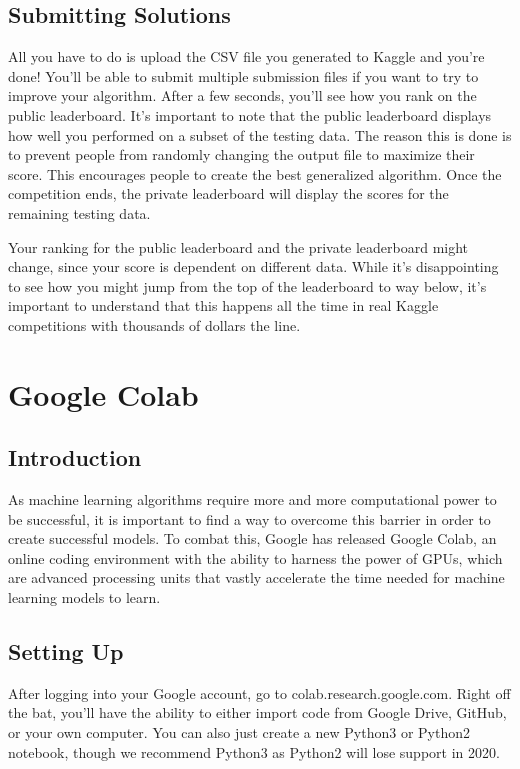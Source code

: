 \documentclass{article}
\begin{document}
\subsection{Submitting Solutions}
All you have to do is upload the CSV file you generated to Kaggle and you're done! You'll be able to submit multiple submission files if you want to try to improve your algorithm.  
After a few seconds, you'll see how you rank on the public leaderboard. It's important to note that the public leaderboard displays how well you performed on a subset of the testing data. The reason this is done is to prevent people from randomly changing the output file to maximize their score. This encourages people to create the best generalized algorithm. Once the competition ends, the private leaderboard will display the scores for the remaining testing data. 

Your ranking for the public leaderboard and the private leaderboard might change, since your score is dependent on different data. While it's disappointing to see how you might jump from the top of the leaderboard to way below, it's important to understand that this happens all the time in real Kaggle competitions with thousands of dollars the line. 

\section{Google Colab}

\subsection{Introduction}

As machine learning algorithms require more and more computational power to be successful, it is important to find a way to overcome this barrier in order to create successful models. To combat this, Google has released Google Colab, an online coding environment with the ability to harness the power of GPUs, which are advanced processing units that vastly accelerate the time needed for machine learning models to learn.

\subsection{Setting Up}

After logging into your Google account, go to colab.research.google.com. Right off the bat, you'll have the ability to either import code from Google Drive, GitHub, or your own computer. You can also just create a new Python3 or Python2 notebook, though we recommend Python3 as Python2 will lose support in 2020.
\end{document}
